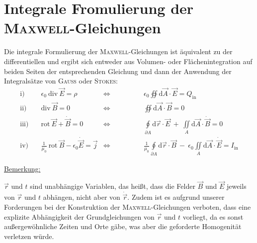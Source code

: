 \section{Integrale Fromulierung der \textsc{Maxwell}-Gleichungen}
Die integrale Formulierung der \textsc{Maxwell}-Gleichungen ist äquivalent zu der differentiellen und ergibt sich entweder aus Volumen- oder Flächenintegration auf beiden Seiten der entsprechenden Gleichung und dann der Anwendung der Integralsätze von \textsc{Gauss} oder \textsc{Stokes}:
\ \\
\begin{align*}
\text{i)} \quad & \epsilon_0 \ \text{div} \ \vec{E} = \rho & \Leftrightarrow \qquad\qquad & \epsilon_0\oiint \mathrm{d}\vec{A} \cdot\vec{E} = Q_{\text{in}} \\
\text{ii)} \quad & \text{div} \ \vec{B} = 0 & \Leftrightarrow \qquad\qquad & \oiint \mathrm{d}\vec{A}\cdot\vec{B} = 0 \\
\text{iii)} \quad & \text{rot} \ \vec{E} + \dot{\vec{B}} = 0 & \Leftrightarrow \qquad\qquad & \oint\limits_{\partial A} \mathrm{d}\vec{r}\cdot\vec{E} \ + \ \iint\limits_A \mathrm{d}\vec{A}\cdot\dot{\vec{B}} = 0 \\
\text{iv)} \quad & \frac{1}{\mu_0} \ \text{rot} \ \vec{B} - \epsilon_0 \dot{\vec{E}} = \vec{j} & \Leftrightarrow \qquad\qquad & \frac{1}{\mu_0}\oint\limits_{\partial A}\mathrm{d}\vec{r}\cdot\vec{B} \ - \ \epsilon_0\iint\limits_A\mathrm{d}\vec{A}\cdot\dot{\vec{E}} = I_{\text{in}}
\end{align*}

\underline{Bemerkung:}

$\vec{r}$ und $t$ sind unabhängige Variablen, das heißt, dass die Felder $\vec{B}$ und $\vec{E}$ jeweils von $\vec{r}$ und $t$ abhängen, nicht aber von $\dot{\vec{r}}$.
Zudem ist es aufgrund unserer Forderungen bei der Konstruktion der \textsc{Maxwell}-Gleichungen verboten, dass eine explizite Abhängigkeit der Grundgleichungen von $\vec{r}$ und $t$ vorliegt, da es sonst außergewöhnliche Zeiten und Orte gäbe, was aber die geforderte Homogenität verletzen würde.